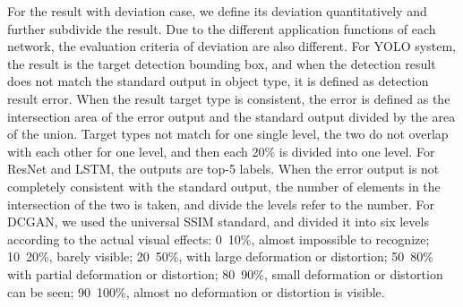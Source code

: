 For the result with deviation case, we define its deviation 
quantitatively and further subdivide the result. Due to the 
different application functions of each network, the 
evaluation criteria of deviation are also different. For 
YOLO system, the result is the target detection bounding 
box, and when the detection result does not match the 
standard output in object type, it is defined as detection 
result error. When the result target type is consistent, 
the error is defined as the intersection area of the error 
output and the standard output divided by the area of the 
union. Target types not match for one single level, the two 
do not overlap with each other for one level, and then each 
20\% is divided into one level. For ResNet and LSTM, the 
outputs are top-5 labels. When the error output is not 
completely consistent with the standard output, the number 
of elements in the intersection of the two is taken, and 
divide the levels refer to the number. For DCGAN, we used 
the universal SSIM standard, and divided it into six levels 
according to the actual visual effects: 0~10\%, almost 
impossible to recognize; 10~20\%, barely visible; 20~50\%, 
with large deformation or distortion; 50~80\% with partial 
deformation or distortion; 80~90\%, small deformation or 
distortion can be seen; 90~100\%, almost no deformation or 
distortion is visible.
